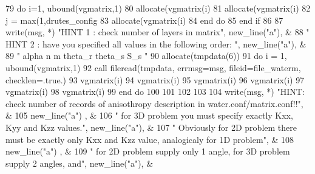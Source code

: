 \begin{DoxyCode}
79         \textcolor{keywordflow}{do} i=1, ubound(vgmatrix,1)
80           \textcolor{keyword}{allocate}(vgmatrix(i)%
81           \textcolor{keyword}{allocate}(vgmatrix(i)%
82           j = max(1,drutes_config%
83           \textcolor{keyword}{allocate}(vgmatrix(i)%
84 \textcolor{keywordflow}{        end do}
85 \textcolor{keywordflow}{      end if}
86 
87       \textcolor{keyword}{write}(msg, *) \textcolor{stringliteral}{"HINT 1 : check number of layers in matrix"}, new\_line\textcolor{comment}{(}\textcolor{stringliteral}{"a"}\textcolor{comment}{), &}
88 \textcolor{comment}{         }\textcolor{stringliteral}{"   HINT 2 : have you specified all values in the following order: "}\textcolor{comment}{, new\_line(}\textcolor{stringliteral}{"a"}\textcolor{comment}{), &}
89 \textcolor{comment}{         }\textcolor{stringliteral}{"         alpha   n   m   theta\_r   theta\_s   S\_s "}
90       \textcolor{keyword}{allocate}(tmpdata(6))
91       \textcolor{keywordflow}{do} i = 1, ubound(vgmatrix,1)
92         \textcolor{keyword}{call }fileread(tmpdata, errmsg=msg, fileid=file_waterm, checklen=\textcolor{comment}{.true.)}
93 \textcolor{comment}{        vgmatrix(i)%
94 \textcolor{comment}{        vgmatrix(i)%
95 \textcolor{comment}{        vgmatrix(i)%
96 \textcolor{comment}{        vgmatrix(i)%
97 \textcolor{comment}{        vgmatrix(i)%
98 \textcolor{comment}{        vgmatrix(i)%
99 \textcolor{comment}{}\textcolor{keywordflow}{      end do}
100       
101      
102 
103 
104       \textcolor{keyword}{write}(msg, *) \textcolor{stringliteral}{"HINT: check number of records of anisothropy description in water.conf/matrix.conf!!"}\textcolor{comment}{,
       &}
105 \textcolor{comment}{        new\_line(}\textcolor{stringliteral}{"a"}) ,  &
106         \textcolor{stringliteral}{"      for 3D problem you must specify exactly Kxx, Kyy and Kzz values."}\textcolor{comment}{, new\_line(}\textcolor{stringliteral}{"a"}\textcolor{comment}{), &}
107 \textcolor{comment}{        }\textcolor{stringliteral}{"       Obviously for 2D problem there must be exactly only Kxx and Kzz value, analogicaly for 1D
       problem"}\textcolor{comment}{, &}
108 \textcolor{comment}{        new\_line(}\textcolor{stringliteral}{"a"}) , &
109         \textcolor{stringliteral}{"       for 2D problem supply only 1 angle, for 3D problem supply 2 angles, and"}\textcolor{comment}{, new\_line(}\textcolor{stringliteral}{"a"}\textcolor{comment}{), &}
}}}}}}
\end{DoxyCode}
